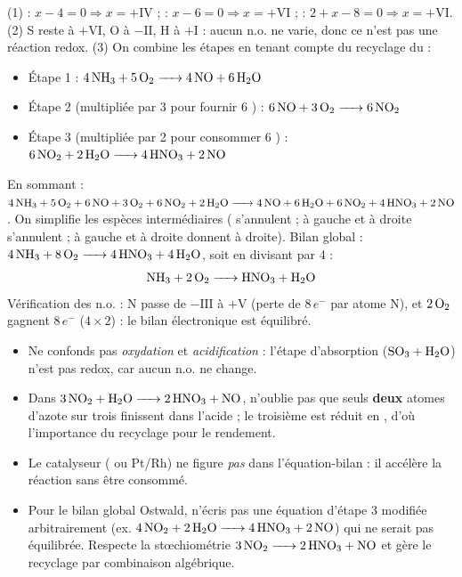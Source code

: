 \documentclass[11pt]{article}
\begin{document}
\begin{corrige}[Exercice 1]
(1)  : $x - 4 = 0 \Rightarrow x = +\mathrm{IV}$ ;  : $x - 6 = 0 \Rightarrow x = +\mathrm{VI}$ ;  : $2 + x - 8 = 0 \Rightarrow x = +\mathrm{VI}$. (2) S reste à $+\mathrm{VI}$, O à $-\mathrm{II}$, H à $+\mathrm{I}$ : aucun n.o. ne varie, donc ce n'est pas une réaction redox. (3) On combine les étapes en tenant compte du recyclage du  :
\begin{itemize}
\item Étape 1 : $\ce{4 NH3 + 5 O2 -> 4 NO + 6 H2O}$
\item Étape 2 (multipliée par 3 pour fournir 6 ) : $\ce{6 NO + 3 O2 -> 6 NO2}$
\item Étape 3 (multipliée par 2 pour consommer 6 ) : $\ce{6 NO2 + 2 H2O -> 4 HNO3 + 2 NO}$
\end{itemize}
En sommant : $\ce{4 NH3 + 5 O2 + 6 NO + 3 O2 + 6 NO2 + 2 H2O -> 4 NO + 6 H2O + 6 NO2 + 4 HNO3 + 2 NO}$.
On simplifie les espèces intermédiaires ( s'annulent ;  à gauche et  à droite s'annulent ;  à gauche et  à droite donnent  à droite).
Bilan global : $\ce{4 NH3 + 8 O2 -> 4 HNO3 + 4 H2O}$, soit en divisant par 4 :
\[ \ce{NH3 + 2 O2 -> HNO3 + H2O} \]
Vérification des n.o. : N passe de $-\mathrm{III}$ à $+\mathrm{V}$ (perte de $8\,e^-$ par atome N), et $2\,\ce{O2}$ gagnent $8\,e^-$ ($4 \times 2$) : le bilan électronique est équilibré.
\end{corrige}

\begin{attention}
\begin{itemize}
\item Ne confonds pas \emph{oxydation} et \emph{acidification} : l'étape d'absorption ($\ce{SO3 + H2O}$) n'est pas redox, car aucun n.o. ne change.
\item Dans $\ce{3 NO2 + H2O -> 2 HNO3 + NO}$, n'oublie pas que seuls \textbf{deux} atomes d'azote sur trois finissent dans l'acide ; le troisième est réduit en , d'où l'importance du recyclage pour le rendement.
\item Le catalyseur ( ou Pt/Rh) ne figure \emph{pas} dans l'équation-bilan : il accélère la réaction sans être consommé.
\item Pour le bilan global Ostwald, n'écris pas une équation d'étape 3 modifiée arbitrairement (ex. $\ce{4 NO2 + 2 H2O -> 4 HNO3 + 2 NO}$) qui ne serait pas équilibrée. Respecte la stœchiométrie $\ce{3 NO2 -> 2 HNO3 + NO}$ et gère le recyclage par combinaison algébrique.
\end{itemize}
\end{attention}
\end{document}
